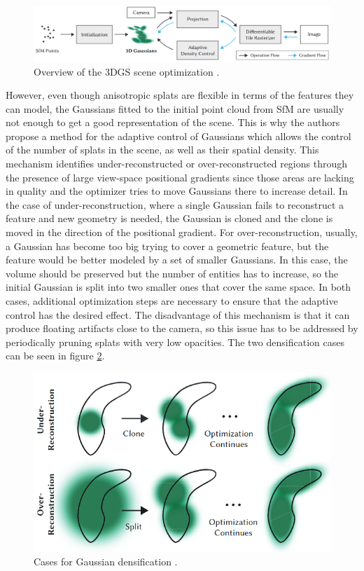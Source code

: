 \begin{figure}[H]
    \centering
    \includegraphics[width=0.7\linewidth]{figures/3dgs.png}
    \caption{Overview of the 3DGS scene optimization \cite{kerbl3Dgaussians}.}
    \label{fig:3dgspipeline}
\end{figure}

However, even though anisotropic splats are flexible in terms of the features they can model, the Gaussians fitted to the initial point cloud from SfM are usually not enough to get a good representation of the scene. This is why the authors propose a method for the adaptive control of Gaussians which allows the control of the number of splats in the scene, as well as their spatial density. This mechanism identifies under-reconstructed or over-reconstructed regions through the presence of large view-space positional gradients since those areas are lacking in quality and the optimizer tries to move Gaussians there to increase detail. In the case of under-reconstruction, where a single Gaussian fails to reconstruct a feature and new geometry is needed, the Gaussian is cloned and the clone is moved in the direction of the positional gradient. For over-reconstruction, usually, a Gaussian has become too big trying to cover a geometric feature, but the feature would be better modeled by a set of smaller Gaussians. In this case, the volume should be preserved but the number of entities has to increase, so the initial Gaussian is split into two smaller ones that cover the same space. In both cases, additional optimization steps are necessary to ensure that the adaptive control has the desired effect. The disadvantage of this mechanism is that it can produce floating artifacts close to the camera, so this issue has to be addressed by periodically pruning splats with very low opacities. The two densification cases can be seen in figure \ref{fig:densification}.

\begin{figure}[H]
    \centering
    \includegraphics[width=0.6\linewidth]{figures/densification.png}
    \caption{Cases for Gaussian densification \cite{kerbl3Dgaussians}.}
    \label{fig:densification}
\end{figure}

